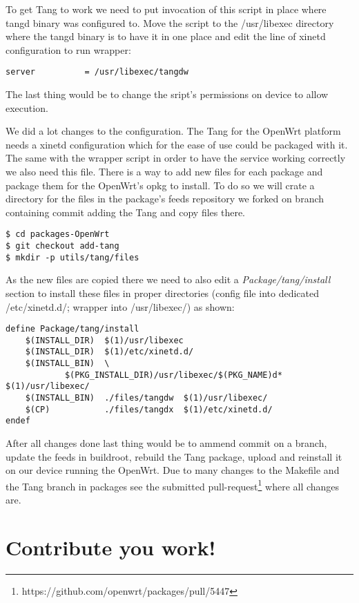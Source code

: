 To get Tang to work we need to put invocation of this script in place where tangd binary was configured to.
Move the script to the /usr/libexec directory where the tangd binary is to have it in one place and edit the line of xinetd configuration to run wrapper:
\begin{lstlisting}[columns=fixed,basicstyle=\ttfamily\footnotesize,tabsize=4,backgroundcolor=\color{yellow!10}]
    server          = /usr/libexec/tangdw
\end{lstlisting}
The last thing would be to change the sript's permissions on device to allow execution.

We did a lot changes to the configuration.
The Tang for the OpenWrt platform needs a xinetd configuration which for the ease of use could be packaged with it.
The same with the wrapper script in order to have the service working correctly we also need this file.
There is a way to add new files for each package and package them for the OpenWrt's opkg to install.
To do so we will crate a directory for the files in the package's feeds repository we forked on branch containing commit adding the Tang and copy files there.
\begin{lstlisting}[columns=fixed,basicstyle=\ttfamily\footnotesize,tabsize=4,backgroundcolor=\color{yellow!10}]
$ cd packages-OpenWrt
$ git checkout add-tang
$ mkdir -p utils/tang/files
\end{lstlisting}
As the new files are copied there we need to also edit a {\it Package/tang/install} section to install these files in proper directories (config file into dedicated /etc/xinetd.d/; wrapper into /usr/libexec/) as shown:
\begin{lstlisting}[columns=fixed,basicstyle=\ttfamily\footnotesize,tabsize=4,backgroundcolor=\color{yellow!10}]
define Package/tang/install
	$(INSTALL_DIR)	$(1)/usr/libexec
	$(INSTALL_DIR)	$(1)/etc/xinetd.d/
	$(INSTALL_BIN)	\
			$(PKG_INSTALL_DIR)/usr/libexec/$(PKG_NAME)d*	$(1)/usr/libexec/
	$(INSTALL_BIN)	./files/tangdw	$(1)/usr/libexec/
	$(CP)			./files/tangdx	$(1)/etc/xinetd.d/
endef
\end{lstlisting}
After all changes done last thing would be to ammend commit on a branch, update the feeds in buildroot, rebuild the Tang package, upload and reinstall it on our device running the OpenWrt.
Due to many changes to the Makefile and the Tang branch in packages see the submitted pull-request\footnote{https://github.com/openwrt/packages/pull/5447} where all changes are.


\section{Contribute you work!}

